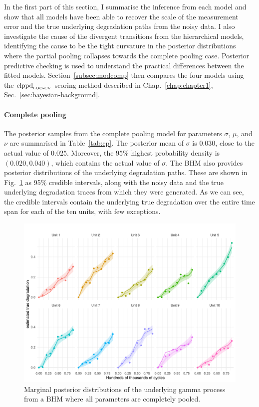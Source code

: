 In the first part of this section, I summarise the inference from each model and show that all models have been able to recover the scale of the measurement error and the true underlying degradation paths from the noisy data. I also investigate the cause of the divergent transitions from the hierarchical models, identifying the cause to be the tight curvature in the posterior distributions where the partial pooling collapses towards the complete pooling case. Posterior predictive checking is used to understand the practical differences between the fitted models. Section~\ref{subsec:modcomp} then compares the four models using the $\hbox{elppd}_{\text{\tiny{LOO-CV}}}$ scoring method described in Chap.~\ref{chap:chapter1}, Sec.~\ref{sec:bayesian-background}.



\paragraph{Complete pooling} The posterior samples from the complete pooling model for parameters $\sigma$, $\mu$, and $\nu$ are summarised in Table~\ref{tab:cp}. The posterior mean of $\sigma$ is $0.030$, close to the actual value of $0.025$. Moreover, the $95\%$ highest probability density is $(0.020, 0.040)$, which contains the actual value of $\sigma$. The BHM also provides posterior distributions of the underlying degradation paths. These are shown in Fig.~\ref{fig:cp_filtered} as 95\% credible intervals, along with the noisy data and the true underlying degradation traces from which they were generated. As we can see, the credible intervals contain the underlying true degradation over the entire time span for each of the ten units, with few exceptions.



\begin{figure}[tbp]
   \centering
   \includegraphics[width=0.95\columnwidth]{./figures/ch-5/plot-cp-filtered.pdf}
   \caption{Marginal posterior distributions of the underlying gamma process from a BHM where all parameters are completely pooled.}
   \label{fig:cp_filtered}
\end{figure}


